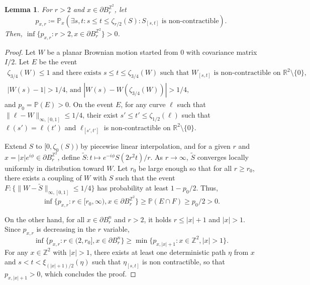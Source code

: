 \documentclass[11pt]{article}
\newtheorem{lemma}[theorem]{Lemma}
\begin{document}
%

\begin{lemma}
\label{le:unifp}
For $r>2$ and $ x \in \partial B^{\mathbb{Z}^2}_{r}$,
    let \[ p_{x,r}\coloneqq
     \mathbb{P}_x( \exists s,t: s \leq t\leq \zeta_{r/2}(S ):  S_{[s,t]} \text{ is non-contractible}  ) .
    \]
    Then,  $\inf\{ p_{x,r}:
    r> 2, x \in \partial B^{\mathbb{Z}^2}_{r} \}   >0$.
\end{lemma}
\begin{proof}
    Let $W$ be a planar Brownian motion started from $0$ with covariance matrix $I/2$. Let $E$ be the event
\[ \begin{array}{c} \zeta_{3/4}(W )\leq 1 \text{ and there exists $s\leq t\leq \zeta_{3/4}(W)$ such that $W_{[s,t]}$ is non-contractible on $\mathbb{R}^2\setminus\{0\}$, }\\ \text{$|W(s)-1|> 1/4$, and $|W(s)-W( \zeta_{3/4}(W )  )|>1/4 $,}
\end{array}
\]
    and $p_0=\mathbb{P}(E)>0$. On the event $E$, for any curve $\ell$ such that $\| \ell-W \|_{\infty,[0,1]}\leq 1/4$, their exist $s'\leq t' \leq  \zeta_{1/2}(\ell) $ such that $\ell(s')=\ell(t')$ and $\ell_{[s',t']}$ is non-contractible  on $\mathbb{R}^2\setminus\{0\}$.

    Extend $S$ to $[0, \zeta_0(S))$ by piecewise linear interpolation, and for a given $r$ and $x=|x| e^{i \phi}\in\partial B^{\mathbb{Z}^2}_{r} $, define $\tilde{S}:t\mapsto e^{-i \phi} S( 2 r^2 t )   /r$. As $r\to \infty$, $\tilde{S}$ converges locally uniformly in distribution toward $W$. Let $r_0$ be large enough so that for all $r\geq r_0$, there exists a coupling of $W$ with $S$ such that the event  $F:\{\|W-\tilde{S}\|_{\infty,[0,1]}\leq 1/4\}$ has probability at least $1-p_0/2$. Thus,
    \[\inf\{ p_{x,r}: r\in [r_0, \infty), x\in \partial B^{\mathbb{Z}^2}_{r}  \} \geq\mathbb{P}(E \cap F)
\geq p_0/2>0.
\]

  On the other hand,
  for all $x\in \partial B^n_{r}$ and $r>2$, it holds $r\leq |x|+1$ and $|x|>1$.
Since $p_{x,r}$ is decreasing in the $r$ variable,
\[\inf\{ p_{x,r}: r\in (2,r_0], x\in \partial B^n_{r}  \}
\geq \min\{ p_{x,|x|+1}: x\in \mathbb{Z}^2, |x|>1   \}.
\]
For any
$x\in  \mathbb{Z}^2$ with $|x|>1$, there exists at least one deterministic path $\eta$ from $x$ and $s<t<\xi_{(|x|+1)/2}(\eta)$ such that $\eta_{[s,t]}$ is non contractible, so that $p_{x,|x|+1}>0$, which concludes the proof.
\end{proof}
\end{document}
